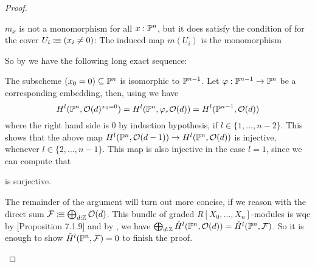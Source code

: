 \begin{proof}
\begin{enumerate}[(i)]
    $m_x$ is not a monomorphism for all $x:\mathbb{P}^n$, but it does satisfy the condition of  for the cover $U_i\vcentcolon\mspace{-1.2mu}\equiv (x_i\neq 0)$:
    The induced map $m(U_i)$ is the monomorphism
    \begin{center}
    \end{center}
    So by  we have the following long exact sequence:
    \begin{center}
    \end{center}
    The subscheme $(x_0=0)\subseteq \mathbb{P}^n$ is isomorphic to $\mathbb{P}^{n-1}$.
    Let $\varphi:\mathbb{P}^{n-1}\to \mathbb{P}^n$ be a corresponding embedding, then, using  we have
    \[
      H^{l}(\mathbb{P}^n,\mathcal O(d)^{x_0=0})=H^l(\mathbb{P}^n,\varphi_\ast\mathcal O(d))=H^l(\mathbb{P}^{n-1},\mathcal O(d))
    \]
    where the right hand side is 0 by induction hypothesis, if $l\in\{1,\dots,n-2\}$.
    This shows that the above map $H^l(\mathbb{P}^n,\mathcal O(d-1))\to H^l(\mathbb{P}^n,\mathcal O(d))$ is injective, whenever $l\in\{2,\dots,n-1\}$.
    This map is also injective in the case $l=1$, since we can compute that
    \begin{center}
    \end{center}
    is surjective.

    The remainder of the argument will turn out more concise, if we reason with the direct sum  $\mathcal F\vcentcolon\mspace{-1.2mu}\equiv \bigoplus_{d:\mathbb{Z}}\mathcal O(d)$.
    This bundle of graded $R[X_0,\dots,X_n]$-modules is wqc by \cite{draft}[Proposition 7.1.9] and by ,
    we have $\bigoplus_{d:\mathbb{Z}}\check{H}^l(\mathbb{P}^n,\mathcal O(d))=\check{H}^l(\mathbb{P}^n,\mathcal F)$.
    So it is enough to show $\check{H}^l(\mathbb{P}^n,\mathcal F)=0$ to finish the proof.


\end{enumerate}
\end{proof}
